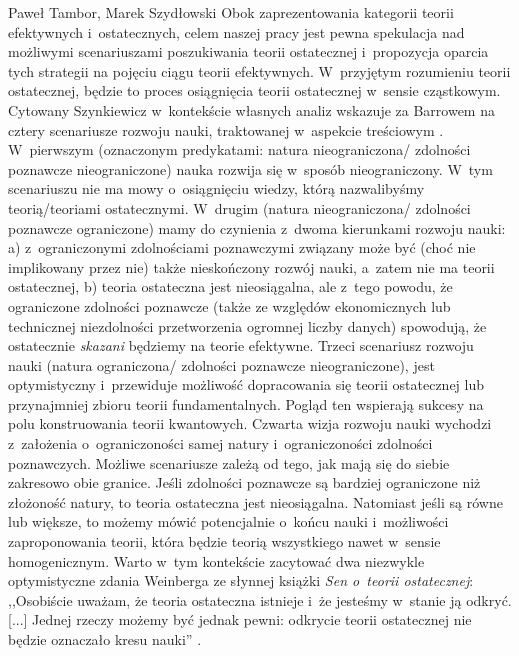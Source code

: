 \begin{artplenv2auth}{Paweł Tambor, Marek Szydłowski}
Obok zaprezentowania kategorii teorii efektywnych i~ostatecznych, celem naszej pracy jest pewna spekulacja nad możliwymi scenariuszami poszukiwania teorii ostatecznej i~propozycja oparcia tych strategii na pojęciu ciągu teorii efektywnych. W~przyjętym rozumieniu teorii ostatecznej, będzie to proces osiągnięcia teorii ostatecznej w~sensie cząstkowym. Cytowany Szynkiewicz w~kontekście własnych analiz wskazuje za Barrowem na cztery scenariusze rozwoju nauki, traktowanej w~aspekcie treściowym
\parencite[][s.~118]{szynkiewicz_teorie_2009}. %
 W~pierwszym (oznaczonym predykatami: natura nieograniczona/ zdolności poznawcze nieograniczone) nauka rozwija się w~sposób nieograniczony. W~tym scenariuszu nie ma mowy o~osiągnięciu wiedzy, którą nazwalibyśmy teorią/teoriami ostatecznymi. W~drugim (natura nieograniczona/ zdolności poznawcze ograniczone) mamy do czynienia z~dwoma kierunkami rozwoju nauki: a) z~ograniczonymi zdolnościami poznawczymi związany może być (choć nie implikowany przez nie) także nieskończony rozwój nauki, a~zatem nie ma teorii ostatecznej, b) teoria ostateczna jest nieosiągalna, ale z~tego powodu, że ograniczone zdolności poznawcze (także ze względów ekonomicznych lub technicznej niezdolności przetworzenia ogromnej liczby danych) spowodują, że ostatecznie \textit{skazani} będziemy na teorie efektywne. Trzeci scenariusz rozwoju nauki (natura ograniczona/ zdolności poznawcze nieograniczone), jest optymistyczny i~przewiduje możliwość dopracowania się teorii ostatecznej lub przynajmniej zbioru teorii fundamentalnych. Pogląd ten wspierają sukcesy na polu konstruowania teorii kwantowych. Czwarta wizja rozwoju nauki wychodzi z~założenia o~ograniczoności samej natury i~ograniczoności zdolności poznawczych. Możliwe scenariusze zależą od tego, jak mają się do siebie zakresowo obie granice. Jeśli zdolności poznawcze są bardziej ograniczone niż złożoność natury, to teoria ostateczna jest nieosiągalna. Natomiast jeśli są równe lub większe, to możemy mówić potencjalnie o~końcu nauki i~możliwości zaproponowania teorii, która będzie teorią wszystkiego nawet w~sensie homogenicznym. Warto w~tym kontekście zacytować dwa niezwykle optymistyczne zdania Weinberga ze słynnej książki \textit{Sen o~teorii ostatecznej}: ,,Osobiście uważam, że teoria ostateczna istnieje i~że jesteśmy w~stanie ją odkryć. [...] Jednej rzeczy możemy być jednak pewni: odkrycie teorii ostatecznej nie będzie oznaczało kresu nauki'' 
\parencite[][s.~186.190]{weinberg_sen_1992}.%



\end{artplenv2auth}
